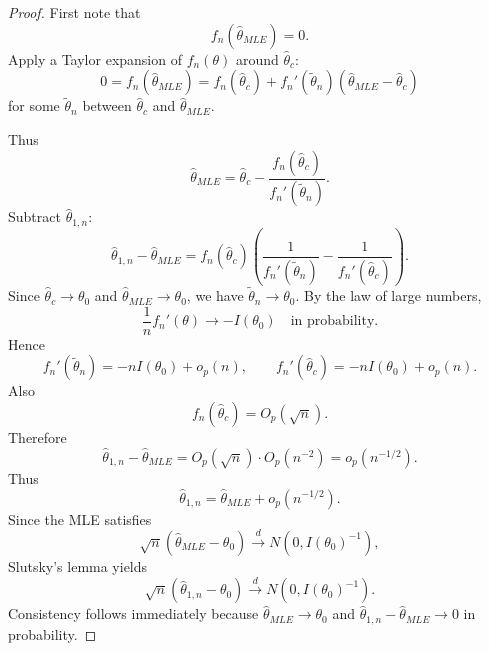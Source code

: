 \documentclass[11pt]{article}
\theoremstyle{definition}
\begin{document}
\begin{proof}
First note that
\[
f_n(\hat\theta_{MLE})=0 .
\]
Apply a Taylor expansion of $f_n(\theta)$ around $\hat\theta_c$:
\[
0
=
f_n(\hat\theta_{MLE})
=
f_n(\hat\theta_c)
+
f_n'(\tilde\theta_n)(\hat\theta_{MLE}-\hat\theta_c)
\]
for some $\tilde\theta_n$ between $\hat\theta_c$ and $\hat\theta_{MLE}$.

Thus
\[
\hat\theta_{MLE}
=
\hat\theta_c
-
\frac{f_n(\hat\theta_c)}{f_n'(\tilde\theta_n)} .
\]
Subtract $\hat\theta_{1,n}$:
\[
\hat\theta_{1,n}-\hat\theta_{MLE}
=
f_n(\hat\theta_c)
\left(
\frac{1}{f_n'(\tilde\theta_n)}
-
\frac{1}{f_n'(\hat\theta_c)}
\right).
\]
Since $\hat\theta_c\to\theta_0$ and $\hat\theta_{MLE}\to\theta_0$, we have
$\tilde\theta_n\to\theta_0$. By the law of large numbers,
\[
\frac{1}{n}f_n'(\theta)
\to
- I(\theta_0)
\quad \text{in probability}.
\]
Hence
\[
f_n'(\tilde\theta_n)
=
- nI(\theta_0)+o_p(n),
\qquad
f_n'(\hat\theta_c)
=
- nI(\theta_0)+o_p(n).
\]
Also
\[
f_n(\hat\theta_c)=O_p(\sqrt n).
\]
Therefore
\[
\hat\theta_{1,n}-\hat\theta_{MLE}
=
O_p(\sqrt n)\cdot O_p(n^{-2})
=
o_p(n^{-1/2}).
\]
Thus
\[
\hat\theta_{1,n}
=
\hat\theta_{MLE}
+
o_p(n^{-1/2}).
\]
Since the MLE satisfies
\[
\sqrt n(\hat\theta_{MLE}-\theta_0)
\xrightarrow{d}
N(0,I(\theta_0)^{-1}),
\]
Slutsky's lemma yields
\[
\sqrt n(\hat\theta_{1,n}-\theta_0)
\xrightarrow{d}
N(0,I(\theta_0)^{-1}).
\]
Consistency follows immediately because $\hat\theta_{MLE}\to\theta_0$ and
$\hat\theta_{1,n}-\hat\theta_{MLE}\to 0$ in probability.
\end{proof}
\end{document}
